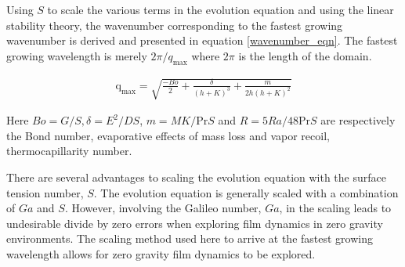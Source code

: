 \documentclass[a4paper,12pt]{article}
\begin{document}
Using $S$ to scale the various terms in the evolution equation and using the linear stability theory, the wavenumber corresponding to the fastest growing wavenumber is derived and presented in equation \ref{wavenumber_eqn}.  The fastest growing wavelength is merely $2\pi/q_\text{max}$ where $2\pi$ is the length of the domain. 




\begin{align} \label{wavenumber_eqn}
 \text{q}_\text{max} = \sqrt{\frac{-Bo}{2} + \frac{\delta}{(h + K)^3} + \frac{m}{2 h (h + K)^2}} 
\end{align}

Here $Bo = G/S, \delta = E^2/DS$, $m = MK/\text{Pr}S$ and $R = 5 Ra/48\text{Pr}S$ are respectively the Bond number, evaporative effects of mass loss and vapor recoil, thermocapillarity number. 

There are several advantages to scaling the evolution equation with the surface tension number, $S$. The evolution equation is generally scaled with a combination of $Ga$ and $S$. However, involving the Galileo number, $Ga$, in the scaling leads to undesirable divide by zero errors when exploring film dynamics in zero gravity environments. The scaling method used here to arrive at the fastest growing wavelength allows for zero gravity film dynamics to be explored. 
\end{document}

